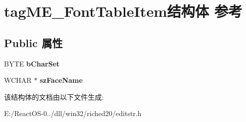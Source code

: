\hypertarget{structtag_m_e___font_table_item}{}\section{tag\+M\+E\+\_\+\+Font\+Table\+Item结构体 参考}
\label{structtag_m_e___font_table_item}
\subsection*{Public 属性}
\begin{DoxyCompactItemize}
\item 
\mbox{\label{structtag_m_e___font_table_item_ae1937d33f9d6bafbe004241678cc3172}} 
B\+Y\+TE {\bfseries b\+Char\+Set}
\item 
\mbox{\label{structtag_m_e___font_table_item_a85b4b46a89c955542ceb9b93531af7af}} 
W\+C\+H\+AR $\ast$ {\bfseries sz\+Face\+Name}
\end{DoxyCompactItemize}


该结构体的文档由以下文件生成\+:\begin{DoxyCompactItemize}
\item 
E\+:/\+React\+O\+S-\/0../dll/win32/riched20/editstr.\+h\end{DoxyCompactItemize}
